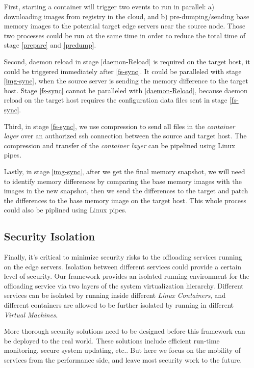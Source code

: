 
First, starting a container will trigger two events to run in parallel: a) downloading  images from registry in the cloud, and b) pre-dumping/sending base memory images to the potential target edge servers near the source node. Those two processes could be run at the same time in order to reduce the total time of stage \ref{prepare} and \ref{predump}. 

Second, daemon reload in stage \ref{daemon-Reload} is required on the target host, it could be triggered immediately after \ref{fs-sync}. It could be paralleled with stage \ref{img-sync}, when the source server is sending the memory difference to the target host. Stage \ref{fs-sync} cannot be paralleled with \ref{daemon-Reload}, because daemon reload on the target host requires the configuration data files sent in stage \ref{fs-sync}.

Third,
in stage \ref{fs-sync}, we use compression to send all files in the \textit{container layer} over an authorized ssh connection between the source and target host. The compression and transfer of the \textit{container layer} can be pipelined using Linux pipes.

Lastly, in stage \ref{img-sync}, after we get the final memory snapshot, we will need to identify memory differences by comparing the base memory images with the images in the new snapshot, then we send the differences to the target and patch the differences to the base memory image on the target host. This whole process could also be piplined using Linux pipes. 



\subsection{Security Isolation}

Finally, it's critical to minimize security risks to the offloading services running on the edge servers. Isolation between different services could provide a certain level of security. Our framework provides an isolated running environment for the offloading service via two layers of the system virtualization hierarchy. Different services can be isolated by running inside different \textit{Linux Containers}, and different containers are allowed to be further isolated by running in different  \textit{Virtual Machines}. 

More thorough security solutions need to be designed before this framework can be deployed to the real world. These solutions include efficient run-time monitoring, secure system updating, etc.. But here we focus on the mobility of services from the performance side, and leave most security work to the future.



